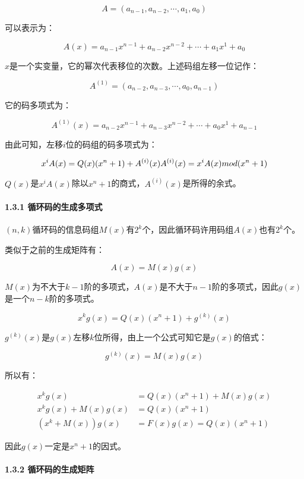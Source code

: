 \documentclass[
]{article}
\begin{document}
\[A = (a_{n-1},a_{n-2},\cdots,a_{1},a_{0})\]

可以表示为：

\[A(x) = a_{n-1}x^{n-1}+a_{n-2}x^{n-2}+\cdots+a_{1}x^{1}+a_{0}\]

\(x\)是一个实变量，它的幂次代表移位的次数。上述码组左移一位记作：

\[A^{(1)} = (a_{n-2},a_{n-3},\cdots,a_{0},a_{n-1})\]

它的码多项式为：

\[A^{(1)}(x) = a_{n-2}x^{n-1}+a_{n-3}x^{n-2}+\cdots+a_{0}x^{1}+a_{n-1}\]

由此可知，左移\(i\)位的码组的码多项式为：

\[x^iA(x) = Q(x)(x^n+1)+A^{(i)}(x)\\
A^{(i)}(x) = x^iA(x) \space mod \space (x^n+1)\]

\(Q(x)\)是\(x^iA(x)\)除以\(x^n+1\)的商式，\(A^{(i)}(x)\)是所得的余式。

\hypertarget{header-n44}{%
\paragraph{1.3.1 循环码的生成多项式}\label{header-n44}}

\((n,k)\)循环码的信息码组\(M(x)\)有\(2^k\)个，因此循环码许用码组\(A(x)\)也有\(2^k\)个。

类似于之前的生成矩阵有：

\[A(x)=M(x)g(x)\]

\(M(x)\)为不大于\(k-1\)阶的多项式，\(A(x)\)是不大于\(n-1\)阶的多项式，因此\(g(x)\)是一个\(n-k\)阶的多项式。

\[x^kg(x)=Q(x)(x^n+1)+g^{(k)}(x)\]

\(g^{(k)}(x)\)是\(g(x)\)左移\(k\)位所得，由上一个公式可知它是\(g(x)\)的倍式：

\[g^{(k)}(x)=M(x)g(x)\]

所以有：

\begin{align}
x^kg(x)&=Q(x)(x^n+1)+M(x)g(x)\\
x^kg(x)+M(x)g(x)&=Q(x)(x^n+1)\\
(x^k+M(x))g(x)&=F(x)g(x)=Q(x)(x^n+1)
\end{align}

因此\(g(x)\)一定是\(x^n+1\)的因式。

\hypertarget{header-n55}{%
\paragraph{1.3.2 循环码的生成矩阵}\label{header-n55}}
\end{document}

